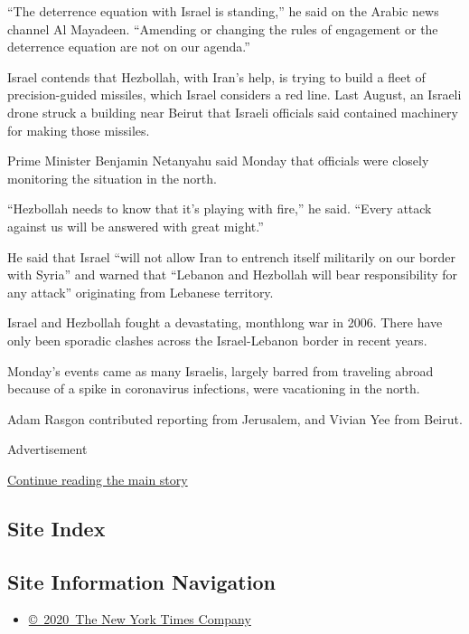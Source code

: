``The deterrence equation with Israel is standing,'' he said on the
Arabic news channel Al Mayadeen. ``Amending or changing the rules of
engagement or the deterrence equation are not on our agenda.''

Israel contends that Hezbollah, with Iran's help, is trying to build a
fleet of precision-guided missiles, which Israel considers a red line.
Last August, an Israeli drone struck a building near Beirut that Israeli
officials said contained machinery for making those missiles.

Prime Minister Benjamin Netanyahu said Monday that officials were
closely monitoring the situation in the north.

``Hezbollah needs to know that it's playing with fire,'' he said.
``Every attack against us will be answered with great might.''

He said that Israel ``will not allow Iran to entrench itself militarily
on our border with Syria'' and warned that ``Lebanon and Hezbollah will
bear responsibility for any attack'' originating from Lebanese
territory.

Israel and Hezbollah fought a devastating, monthlong war in 2006. There
have only been sporadic clashes across the Israel-Lebanon border in
recent years.

Monday's events came as many Israelis, largely barred from traveling
abroad because of a spike in coronavirus infections, were vacationing in
the north.

Adam Rasgon contributed reporting from Jerusalem, and Vivian Yee from
Beirut.

Advertisement

\protect\hyperlink{after-bottom}{Continue reading the main story}

\hypertarget{site-index}{%
\subsection{Site Index}\label{site-index}}

\hypertarget{site-information-navigation}{%
\subsection{Site Information
Navigation}\label{site-information-navigation}}

\begin{itemize}
\tightlist
\item
  \href{https://help.nytimes.com/hc/en-us/articles/115014792127-Copyright-notice}{©~2020~The
  New York Times Company}
\end{itemize}

